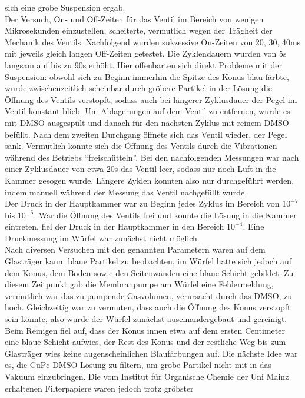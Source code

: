 sich eine grobe Suspension ergab.\\ 
Der Versuch, On- und Off-Zeiten für das Ventil im
Bereich von wenigen Mikrosekunden einzustellen,
scheiterte, vermutlich wegen der Trägheit der Mechanik des
Ventils. Nachfolgend wurden sukzessive
On-Zeiten von 20, 30, 40ms mit jeweils gleich
langen Off-Zeiten getestet. Die Zyklendauern
wurden von 5s langsam auf bis zu 90s erhöht.
Hier offenbarten sich direkt Probleme mit der
Suspension: obwohl sich zu Beginn immerhin die
Spitze des Konus blau färbte, wurde
zwischenzeitlich scheinbar durch gröbere Partikel
in der Lösung die Öffnung des Ventils verstopft,
sodass auch bei längerer Zyklusdauer der Pegel im
Ventil konstant blieb. Um Ablagerungen auf dem
Ventil zu entfernen, wurde es mit DMSO ausgespült
und danach für den nächsten Zyklus mit reinem
DMSO befüllt. Nach dem zweiten Durchgang öffnete
sich das Ventil wieder, der Pegel sank.
Vermutlich konnte sich die Öffnung des Ventils
durch die Vibrationen während des Betriebs
"`freischütteln"'. Bei den nachfolgenden
Messungen war nach einer Zyklusdauer von etwa 20s
das Ventil leer, sodass nur noch Luft in die
Kammer gesogen wurde.
Längere Zyklen konnten also nur durchgeführt
werden, indem manuell während der Messung das
Ventil nachgefüllt wurde.
\\
Der Druck in der Hauptkammer war zu Beginn jedes
Zyklus im Bereich von $10^{-7}$ bis $10^{-6}$.
War die Öffnung des Ventils frei und konnte die
Lösung in die Kammer eintreten, fiel der Druck in
der Hauptkammer in den Bereich $10^{-4}$. Eine
Druckmessung im Würfel war zunächst nicht möglich.\\
Nach diversen Versuchen mit den genannten Parametern waren auf dem Glasträger kaum blaue Partikel zu
beobachten, im Würfel hatte sich jedoch auf dem Konus, dem Boden sowie den Seitenwänden eine blaue Schicht
gebildet. Zu diesem Zeitpunkt gab die Membranpumpe am Würfel eine Fehlermeldung, vermutlich war das
zu pumpende Gasvolumen, verursacht durch das DMSO, zu hoch. Gleichzeitig war zu vermuten, dass auch die
Öffnung des Konus verstopft sein könnte, also wurde der Würfel zunächst auseinandergebaut und gereinigt.\\
Beim Reinigen fiel auf, dass der Konus innen etwa auf dem ersten Centimeter eine blaue Schicht aufwies, der
Rest des Konus und der restliche Weg bis zum Glasträger wies keine augenscheinlichen Blaufärbungen auf. Die
nächste Idee war es, die CuPc-DMSO Lösung zu filtern, um grobe Partikel nicht mit in das Vakuum einzubringen.
Die vom Institut für Organische Chemie der Uni Mainz erhaltenen Filterpapiere waren jedoch  trotz gröbster
